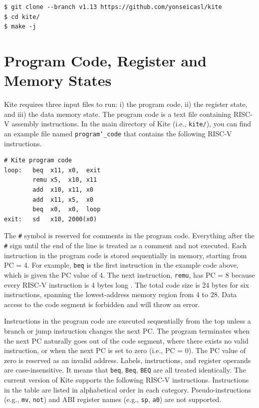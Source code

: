 \documentclass[10pt]{article}
\begin{document}
\begin{Verbatim}[frame=single,fontsize=\small]
$ git clone --branch v1.13 https://github.com/yonseicasl/kite
$ cd kite/
$ make -j
\end{Verbatim}


\section{Program Code, Register and Memory States} \label{sec:inputs}
Kite requires three input files to run: i) the program code, ii) the register state, and iii) the data memory state.
The program code is a text file containing RISC-V assembly instructions.
In the main directory of Kite (i.e., {\tt\small kite/}), you can find an example file named {\tt\small program\char`_code} that contains the following RISC-V instructions.

\begin{Verbatim}[frame=single,fontsize=\small]
# Kite program code
loop:   beq  x11, x0,  exit
        remu x5,  x10, x11
        add  x10, x11, x0
        add  x11, x5,  x0
        beq  x0,  x0,  loop
exit:   sd   x10, 2000(x0)
\end{Verbatim}

The {\tt\small \#} symbol is reserved for comments in the program code.
Everything after the {\tt\small \#} sign until the end of the line is treated as a comment and not executed.
Each instruction in the program code is stored sequentially in memory, starting from PC = 4.
For example, {\tt\small beq} is the first instruction in the example code above, which is given the PC value of 4.
The next instruction, {\tt\small remu}, has PC = 8 because every RISC-V instruction is 4 bytes long \cite{waterman_riscv2019}.
The total code size is 24 bytes for six instructions, spanning the lowest-address memory region from 4 to 28.
Data access to the code segment is forbidden and will throw an error.

Instructions in the program code are executed sequentially from the top unless a branch or jump instruction changes the next PC.
The program terminates when the next PC naturally goes out of the code segment, where there exists no valid instruction, or when the next PC is set to zero (i.e., PC = 0).
The PC value of zero is reserved as an invalid address.
Labels, instructions, and register operands are case-insensitive.
It means that {\tt\small beq}, {\tt\small Beq}, {\tt\small BEQ} are all treated identically.
The current version of Kite supports the following RISC-V instructions.
Instructions in the table are listed in alphabetical order in each category.
Pseudo-instructions (e.g., {\tt\small mv}, {\tt\small not}) and ABI register names (e.g., {\tt\small sp}, {\tt\small a0}) are not supported.
\end{document}

